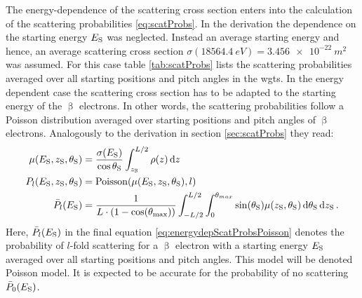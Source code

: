 The energy-dependence of the scattering cross section enters into the calculation of the scattering probabilities \eqref{eq:scatProbs}. In the derivation the dependence on the starting energy $E_\mathrm{S}$ was neglected. Instead an average starting energy and hence, an average scattering cross section $\sigma(\SI{18564.4}{eV})=\SI{3.456e-22}{m^2}$ was assumed. For this case table \ref{tab:scatProbs} lists the scattering probabilities averaged over all starting positions and pitch angles in the \gls{wgts}.
In the energy dependent case the scattering cross section has to be adapted to the starting energy of the $\upbeta$ electrons. In other words, the scattering probabilities follow a Poisson distribution averaged over starting positions and pitch angles of $\upbeta$ electrons. Analogously to the derivation in section \ref{sec:scatProbs} they read:
\begin{subequations}
\label{eq:energydepScatProbsPoissonModel}
\begin{align}
    \mu(E_\mathrm{S},z_\mathrm{S},\theta_\mathrm{S}) &=
    \frac{\sigma(E_\mathrm{S})}{\cos\theta_\mathrm{S}}
    \int_{z_\mathrm{S}}^{L/2} \rho(z)\mathop{}\!\mathrm{d} z \label{eq:energydepScatProbsPoissonExpectedScatCount} \\
    P_l(E_\mathrm{S},z_\mathrm{S},\theta_\mathrm{S}) &=
    \mathrm{Poisson}(\mu(E_\mathrm{S},z_\mathrm{S},\theta_\mathrm{S}),l) \label{eq:nonAveragedEnergydepScatProbsPoisson} \\
    \bar{P}_l(E_\mathrm{S}) &=
    \frac{1}{L \cdot (1-\cos(\theta_\mathrm{max}))} 
      \int_{-L/2}^{L/2}  
          \int_{0}^{\theta_{max}} 
            \sin(\theta_\mathrm{S})
            \mu(z_\mathrm{S},\theta_\mathrm{S})
          \mathop{}\!\mathrm{d}\theta_\mathrm{S}
      \mathop{}\!\mathrm{d}z_\mathrm{S}
      \label{eq:energydepScatProbsPoisson}
    \text{\,.}
\end{align}
\end{subequations}
Here, $\bar{P}_l(E_\mathrm{S})$ in the final equation \eqref{eq:energydepScatProbsPoisson} denotes the probability of $l$-fold scattering for a $\upbeta$ electron with a starting energy $E_\mathrm{S}$ averaged over all starting positions and pitch angles. This model will be denoted Poisson model. It is expected to be accurate for the probability of no scattering $\bar{P}_0(E_\mathrm{S})$.

